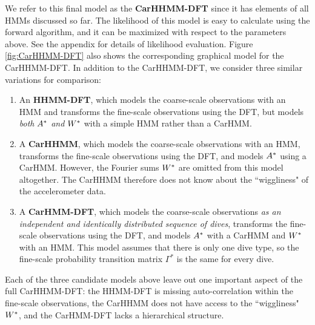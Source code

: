 We refer to this final model as the \textbf{CarHHMM-DFT} since it has elements of all HMMs discussed so far. The likelihood of this model is easy to calculate using the forward algorithm, and it can be maximized with respect to the parameters above. See the appendix for details of likelihood evaluation. Figure \ref{fig:CarHHMM-DFT} also shows the corresponding graphical model for the CarHHMM-DFT. In addition to the CarHHMM-DFT, we consider three similar variations for comparison:
\begin{enumerate}
    \item An \textbf{HHMM-DFT}, which models the coarse-scale observations with an HMM and transforms the fine-scale observations using the DFT, but models \textit{both} $A^*$ \textit{and} $W^*$ with a simple HMM rather than a CarHMM.
    \item A \textbf{CarHHMM}, which models the coarse-scale observations with an HMM, transforms the fine-scale observations using the DFT, and models $A^*$ using a CarHMM. However, the Fourier sums $W^*$ are omitted from this model altogether. The CarHHMM therefore does not know about the ``wiggliness" of the accelerometer data.
    \item A \textbf{CarHMM-DFT}, which models the coarse-scale observations \textit{as an independent and identically distributed sequence of dives}, transforms the fine-scale observations using the DFT, and models $A^*$ with a CarHMM and $W^*$ with an HMM. This model assumes that there is only one dive type, so the fine-scale probability transition matrix $\Gamma^*$ is the same for every dive. 
\end{enumerate}

Each of the three candidate models above leave out one important aspect of the full CarHHMM-DFT: the HHMM-DFT is missing auto-correlation within the fine-scale observations, the CarHHMM does not have access to the ``wiggliness" $W^*$, and the CarHMM-DFT lacks a hierarchical structure.